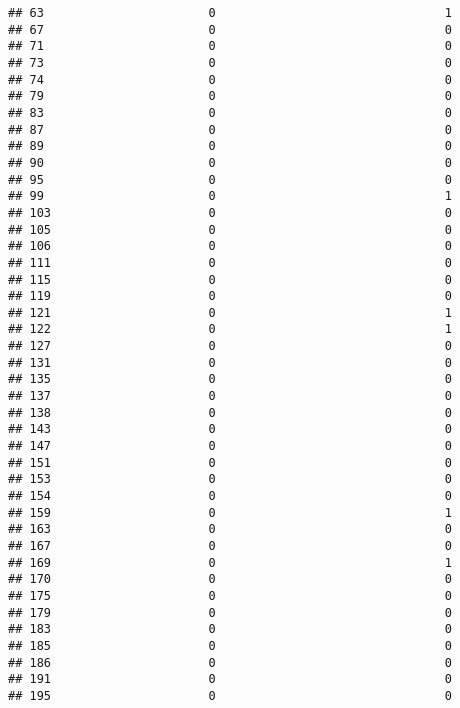 \documentclass[
]{article}
\begin{document}
\begin{verbatim}
## 63                       0                                1
## 67                       0                                0
## 71                       0                                0
## 73                       0                                0
## 74                       0                                0
## 79                       0                                0
## 83                       0                                0
## 87                       0                                0
## 89                       0                                0
## 90                       0                                0
## 95                       0                                0
## 99                       0                                1
## 103                      0                                0
## 105                      0                                0
## 106                      0                                0
## 111                      0                                0
## 115                      0                                0
## 119                      0                                0
## 121                      0                                1
## 122                      0                                1
## 127                      0                                0
## 131                      0                                0
## 135                      0                                0
## 137                      0                                0
## 138                      0                                0
## 143                      0                                0
## 147                      0                                0
## 151                      0                                0
## 153                      0                                0
## 154                      0                                0
## 159                      0                                1
## 163                      0                                0
## 167                      0                                0
## 169                      0                                1
## 170                      0                                0
## 175                      0                                0
## 179                      0                                0
## 183                      0                                0
## 185                      0                                0
## 186                      0                                0
## 191                      0                                0
## 195                      0                                0

\end{verbatim}
\end{document}
